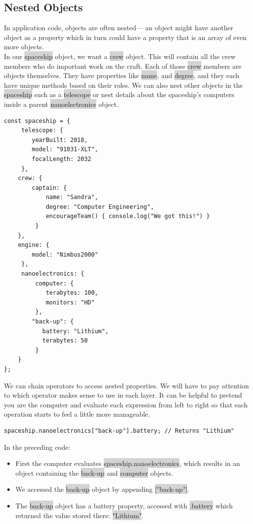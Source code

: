 \documentclass[11pt]{article}
\begin{document}
\subsection{Nested Objects}
In application code, objects are often nested— an object might have another object as a property which in turn could have a property that is an array of even more objects. \\
\newline
In our \colorbox{lightgray}{spaceship} object, we want a \colorbox{lightgray}{crew} object. This will contain all the crew members who do important work on the craft. Each of those \colorbox{lightgray}{crew} members are objects themselves. They have properties like \colorbox{lightgray}{name}, and \colorbox{lightgray}{degree}, and they each have unique methods based on their roles. We can also nest other objects in the \colorbox{lightgray}{spaceship} such as a \colorbox{lightgray}{telescope} or nest details about the spaceship’s computers inside a parent \colorbox{lightgray}{nanoelectronics} object. 
\begin{lstlisting}
const spaceship = {
     telescope: {
        yearBuilt: 2018,
        model: "91031-XLT",
        focalLength: 2032 
     },
    crew: {
        captain: { 
            name: "Sandra", 
            degree: "Computer Engineering", 
            encourageTeam() { console.log("We got this!") } 
         }
    },
    engine: {
        model: "Nimbus2000"
     },
     nanoelectronics: {
         computer: {
            terabytes: 100,
            monitors: "HD"
         },
        "back-up": {
           battery: "Lithium",
           terabytes: 50
         }
    }
}; 
\end{lstlisting}
We can chain operators to access nested properties. We will have to pay attention to which operator makes sense to use in each layer. It can be helpful to pretend you are the computer and evaluate each expression from left to right so that each operation starts to feel a little more manageable.
\begin{lstlisting}
spaceship.nanoelectronics["back-up"].battery; // Returns "Lithium"
\end{lstlisting}
In the preceding code:
\begin{itemize}[leftmargin = *]
\item First the computer evaluates \colorbox{lightgray}{spaceship.nanoelectronics}, which results in an object containing the \colorbox{lightgray}{back-up} and \colorbox{lightgray}{computer} objects.
\item We accessed the \colorbox{lightgray}{back-up} object by appending \colorbox{lightgray}{["back-up"]}.
\item The \colorbox{lightgray}{back-up} object has a battery property, accessed with \colorbox{lightgray}{.battery} which returned the value stored there: \colorbox{lightgray}{"Lithium"}. 
\end{itemize}
\end{document}
